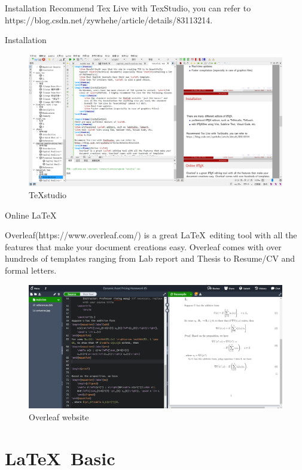 \documentclass[11pt]{beamer}
\begin{document}
\begin{CJK*}{UTF8}{gkai}
\begin{frame}{Installation}
Recommend Tex Live with TexStudio, you can refer to https://blog.csdn.net/zywhehe/article/details/83113214. 
\end{frame}

\begin{frame}{Installation}
 \begin{figure}
 	\centering
 	\includegraphics[width=0.85\linewidth]{figs/TeXstudio}
 	\caption{TeXstudio}
 	\label{fig:texstudio}
 \end{figure}
 
\end{frame}
\begin{frame}{Online \LaTeX}
	
	Overleaf(https://www.overleaf.com/) is a great \LaTeX\ editing tool with all the features that make your document creations easy. Overleaf comes with over hundreds of templates ranging from Lab report and Thesis to Resume/CV and formal letters. 
\begin{figure}
	\centering
	\includegraphics[width=0.7\linewidth]{figs/overleaf}
	\caption{Overleaf website}
	\label{fig:overleaf}
\end{figure}
\end{frame}


\section{\LaTeX\ Basic}


\begin{frame}
	\sectionpage
\end{frame}



\end{CJK*}
\end{document}
